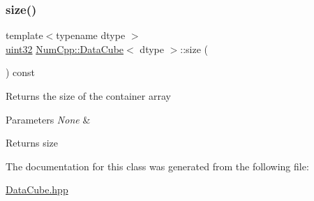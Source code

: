 \subsubsection{\texorpdfstring{size()}{size()}}
{\footnotesize\ttfamily template$<$typename dtype $>$ \\
\mbox{\hyperlink{namespace_num_cpp_a36f388e948380413c63011cab9b7fbd5}{uint32}} \mbox{\hyperlink{class_num_cpp_1_1_data_cube}{Num\+Cpp\+::\+Data\+Cube}}$<$ dtype $>$\+::size (\begin{DoxyParamCaption}{ }\end{DoxyParamCaption}) const\hspace{0.3cm}{\ttfamily [inline]}}

Returns the size of the container array


\begin{DoxyParams}{Parameters}
{\em None} & \\
\hline
\end{DoxyParams}
\begin{DoxyReturn}{Returns}
size 
\end{DoxyReturn}


The documentation for this class was generated from the following file\+:\begin{DoxyCompactItemize}
\item 
\mbox{\hyperlink{_data_cube_8hpp}{Data\+Cube.\+hpp}}\end{DoxyCompactItemize}
